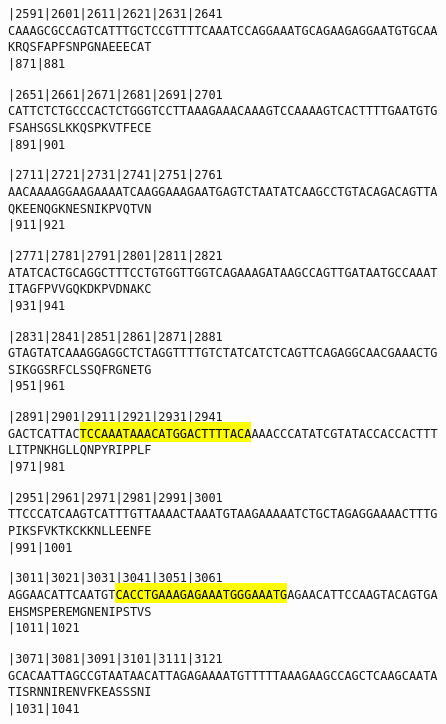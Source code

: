\documentclass{article}
\begin{document}
\newpage
\begin{alltt}
|2591     |2601     |2611     |2621     |2631     |2641     
CAAAGCGCCAGTCATTTGCTCCGTTTTCAAATCCAGGAAATGCAGAAGAGGAATGTGCAA
  K  R  Q  S  F  A  P  F  S  N  P  G  N  A  E  E  E  C  A  T
                    |871                          |881      

|2651     |2661     |2671     |2681     |2691     |2701     
CATTCTCTGCCCACTCTGGGTCCTTAAAGAAACAAAGTCCAAAAGTCACTTTTGAATGTG
  F  S  A  H  S  G  S  L  K  K  Q  S  P  K  V  T  F  E  C  E
                    |891                          |901      

|2711     |2721     |2731     |2741     |2751     |2761     
AACAAAAGGAAGAAAATCAAGGAAAGAATGAGTCTAATATCAAGCCTGTACAGACAGTTA
  Q  K  E  E  N  Q  G  K  N  E  S  N  I  K  P  V  Q  T  V  N
                    |911                          |921      

|2771     |2781     |2791     |2801     |2811     |2821     
ATATCACTGCAGGCTTTCCTGTGGTTGGTCAGAAAGATAAGCCAGTTGATAATGCCAAAT
  I  T  A  G  F  P  V  V  G  Q  K  D  K  P  V  D  N  A  K  C
                    |931                          |941      

|2831     |2841     |2851     |2861     |2871     |2881     
GTAGTATCAAAGGAGGCTCTAGGTTTTGTCTATCATCTCAGTTCAGAGGCAACGAAACTG
  S  I  K  G  G  S  R  F  C  L  S  S  Q  F  R  G  N  E  T  G
                    |951                          |961      

|2891     |2901     |2911     |2921     |2931     |2941     
GACTCATTAC\hl{TCCAAATAAACATGGACTTTTACA}AAACCCATATCGTATACCACCACTTT
  L  I  T  P  N  K  H  G  L  L  Q  N  P  Y  R  I  P  P  L  F
                    |971                          |981      

|2951     |2961     |2971     |2981     |2991     |3001     
TTCCCATCAAGTCATTTGTTAAAACTAAATGTAAGAAAAATCTGCTAGAGGAAAACTTTG
  P  I  K  S  F  V  K  T  K  C  K  K  N  L  L  E  E  N  F  E
                    |991                          |1001     

|3011     |3021     |3031     |3041     |3051     |3061     
AGGAACATTCAATGT\hl{CACCTGAAAGAGAAATGGGAAATG}AGAACATTCCAAGTACAGTGA
  E  H  S  M  S  P  E  R  E  M  G  N  E  N  I  P  S  T  V  S
                    |1011                         |1021     

|3071     |3081     |3091     |3101     |3111     |3121     
GCACAATTAGCCGTAATAACATTAGAGAAAATGTTTTTAAAGAAGCCAGCTCAAGCAATA
  T  I  S  R  N  N  I  R  E  N  V  F  K  E  A  S  S  S  N  I
                    |1031                         |1041     

\end{alltt}
\end{document}
